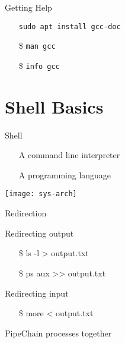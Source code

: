 \begin{frame}{Getting Help}
  \begin{itemize}
  \item[\debian] \texttt{sudo apt install gcc-doc}
  \item[\$] \texttt{man gcc}
  \item[\$] \texttt{info gcc}
  \end{itemize}
\end{frame}

\section{Shell Basics}
\label{sec:basic-commands}

\begin{frame}{Shell}
  \begin{itemize}
  \item[\shell] A command line interpreter
  \item[\shell] A programming language
  \end{itemize}
  \begin{center}
    \texttt{[image: sys-arch]}
  \end{center}
\end{frame}

\begin{frame}{Redirection}
  \begin{block}{Redirecting output}\ttfamily
    \begin{itemize}
    \item[\$] ls -l > output.txt
    \item[\$] ps aux >> output.txt
    \end{itemize}
  \end{block}
  \begin{block}{Redirecting input}\ttfamily
    \begin{itemize}
    \item[\$] more < output.txt
    \end{itemize}
  \end{block}
\end{frame}

\begin{frame}{Pipe}{Chain processes together}
\end{frame}


